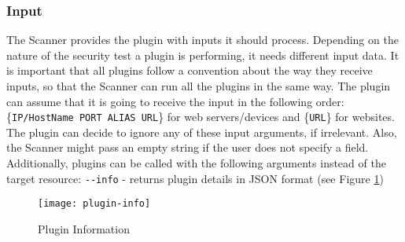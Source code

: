 \subsubsection{Input}
The Scanner provides the plugin with inputs it should process. Depending on the nature of the security test a plugin is performing, it needs different input data. It is important that all plugins follow a convention about the way they receive inputs, so that the Scanner can run all the plugins in the same way. The plugin can assume that it is going to receive the input in the following order: \{\texttt{IP/HostName PORT ALIAS URL}\} for web servers/devices and \{\texttt{URL}\} for websites. The plugin can decide to ignore any of these input arguments, if irrelevant. Also, the Scanner might pass an empty string if the user does not specify a field.
\\
Additionally, plugins can be called with the following arguments instead of the target resource:
\texttt{-{}-info} - returns plugin details in JSON format (see Figure \ref{figure:plugin-info})  
\begin{figure}[h!]

  \centering
    \texttt{[image: plugin-info]}
  \caption{Plugin Information}
\label{figure:plugin-info}
  
\end{figure}
